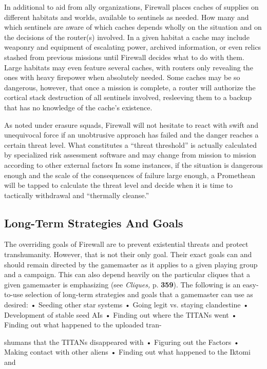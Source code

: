 In additional to aid from ally organizations, Firewall
places caches of supplies on different habitats
and worlds, available to sentinels as needed. How 
many and which sentinels are aware of which 
caches depends wholly on the situation and on the 
decisions of the router(s) involved. In a given habitat
a cache may include weaponry and equipment
of escalating power, archived information, or even 
relics stashed from previous missions until Firewall 
decides what to do with them. Large habitats may 
even feature several caches, with routers only revealing
the ones with heavy firepower when absolutely
needed. Some caches may be so dangerous,
however, that once a mission is complete, a router 
will authorize the cortical stack destruction of all 
sentinels involved, resleeving them to a backup that 
has no knowledge of the cache's existence.

As noted under erasure squads, Firewall will not 
hesitate to react with swift and unequivocal force if 
an unobtrusive approach has failed and the danger 
reaches a certain threat level. What constitutes a 
``threat threshold'' is actually calculated by specialized
risk assessment software and may change from
mission to mission according to other external factors
In some instances, if the situation is dangerous
enough and the scale of the consequences of failure 
large enough, a Promethean will be tapped to calculate
the threat level and decide when it is time to
tactically withdrawal and ``thermally cleanse.'' 

\subsection{Long-Term Strategies And Goals }

The overriding goals of Firewall are to prevent existential
threats and protect transhumanity. However, that
is not their only goal. Their exact goals can and should 
remain directed by the gamemaster as it applies to a 
given playing group and a campaign. This can also 
depend heavily on the particular cliques that a given 
gamemaster is emphasizing (see \textit{Cliques,} p. \textbf{359}). 
The following is an easy-to-use selection of long-term
strategies and goals that a gamemaster can use
as desired: 
•  Seeding other star systems 
•  Going legit vs. staying clandestine 
•  Development of stable seed AIs 
•  Finding out where the TITANs went 
•  Finding out what happened to the uploaded tran-

shumans that the TITANs disappeared with 
•  Figuring out the Factors 
•  Making contact with other aliens 
•  Finding out what happened to the Iktomi and 

